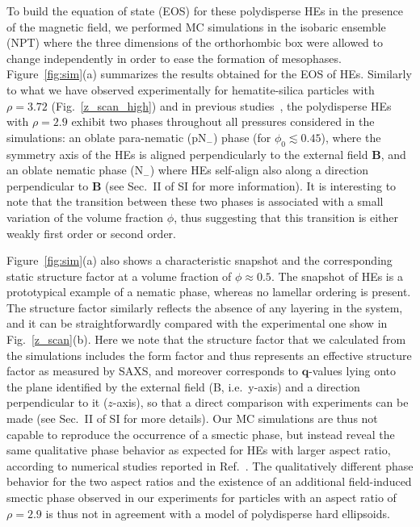 \documentclass[aps,prl,preprint,superscriptaddress,showkeys]{revtex4-2} %
\begin{document}
To build the equation of state (EOS) for these polydisperse HEs in the presence of the magnetic field, we performed MC simulations in the isobaric ensemble (NPT) where the three dimensions of the orthorhombic box were allowed to change independently in order to ease the formation of mesophases. Figure~\ref{fig:sim}(a) summarizes the results obtained for the EOS of HEs. Similarly to what we have observed experimentally for hematite-silica particles with $\rho=3.72$ (Fig.~\ref{z_scan_high}) and in previous studies~\cite{martchenko2016anisotropic}, the polydisperse HEs with $\rho = 2.9$ exhibit two phases throughout all pressures considered in the simulations: an oblate para-nematic (pN$_-$) phase (for $\phi_0\lesssim 0.45$), where the symmetry axis of the HEs is aligned perpendicularly to the  external field $\mathbf{B}$, and an oblate nematic phase (N$_-$) where HEs self-align also along a direction perpendicular to $\mathbf{B}$ (see Sec.~II of SI for more information). It is interesting to note that the transition between these two phases is associated with a small variation of the volume fraction $\phi$, thus suggesting that this transition is either weakly first order or second order.\par
Figure~\ref{fig:sim}(a) also shows a characteristic snapshot and the corresponding static structure factor at a volume fraction of $\phi \approx 0.5$. The snapshot of HEs is a prototypical example of a nematic phase, whereas no lamellar ordering is present. The structure factor similarly reflects the absence of any layering in the system, and it can be straightforwardly compared with the experimental one show in Fig.~\ref{z_scan}(b). Here we note that the structure factor that we calculated from the simulations includes the form factor and thus represents an effective structure factor as measured by SAXS, and moreover corresponds to $\mathbf{q}$-values lying onto the plane identified by the external field (B, i.e.~y-axis) and a direction perpendicular to it ($z$-axis), so that a direct comparison with experiments can be made (see Sec.~II of SI for more details). Our MC simulations are thus not capable to reproduce the occurrence of a smectic phase, but instead reveal the same qualitative phase behavior as expected for HEs with larger aspect ratio, according to numerical studies reported in Ref.~\cite{martchenko2016anisotropic}. The qualitatively different phase behavior for the two aspect ratios and the existence of an additional field-induced smectic phase observed in our experiments for particles with an aspect ratio of $\rho = 2.9$ is thus not in agreement with a model of polydisperse hard ellipsoids.\par
\end{document}
